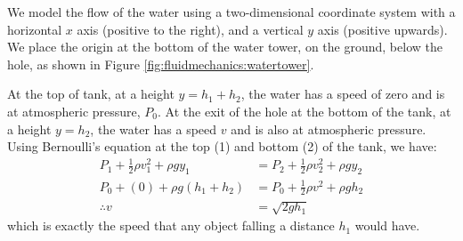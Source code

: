{{\begin{example}
We model the flow of the water using a two-dimensional coordinate system with a horizontal $x$ axis (positive to the right), and a vertical $y$ axis (positive upwards). We place the origin at the bottom of the water tower, on the ground, below the hole, as shown in Figure \ref{fig:fluidmechanics:watertower}.
 
At the top of tank, at a height $y = h_1+h_2$, the water has a speed of zero and is at atmospheric pressure, $P_0$. At the exit of the hole at the bottom of the tank, at a height $y = h_2$, the water has a speed $v$ and is also at atmospheric pressure. Using Bernoulli's equation at the top (1) and bottom (2) of the tank, we have:
\begin{align*}
P_1 +\frac{1}{2}\rho v_1^2+ \rho g y_1&= P_2 + \frac{1}{2}\rho v_2^2 + \rho g y_2\\
P_0 + (0) + \rho g (h_1+h_2) &= P_0 +  \frac{1}{2}\rho v^2 + \rho g h_2\\
\therefore v &= \sqrt{2gh_1}
\end{align*}
which is exactly the speed that any object falling a distance $h_1$ would have. 


\end{example}}}
